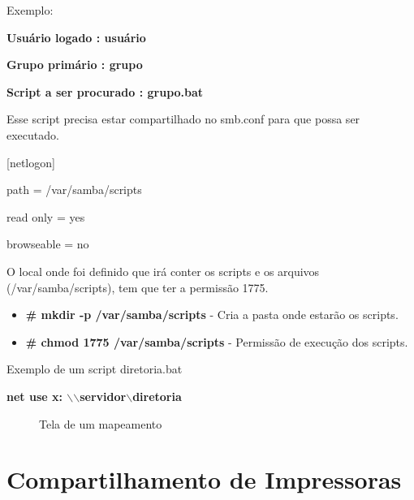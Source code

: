 Exemplo: 

\textbf{Usuário logado : usuário}

\textbf{Grupo primário : grupo}

\textbf{Script a ser procurado : grupo.bat}

Esse script precisa estar compartilhado no smb.conf para que possa ser executado. 

	[netlogon] 

		path = /var/samba/scripts 

		read only = yes 

		browseable = no 
		


O local onde foi definido que irá conter os scripts e os arquivos (/var/samba/scripts), tem que ter a permissão 1775. 

\begin{itemize}
	\item \textbf{\# mkdir -p /var/samba/scripts} - Cria a pasta onde estarão os scripts.
	\item \textbf{\# chmod 1775 /var/samba/scripts} - Permissão de execução dos scripts.
\end{itemize}

Exemplo de um script diretoria.bat 

\textbf{net use x: $\backslash$$\backslash$servidor$\backslash$diretoria}

\begin{figure}[ht]
   	\centering
   	\caption{Tela de um mapeamento}
    \label{mapeamento}
\end{figure} 

\section{Compartilhamento de Impressoras}

